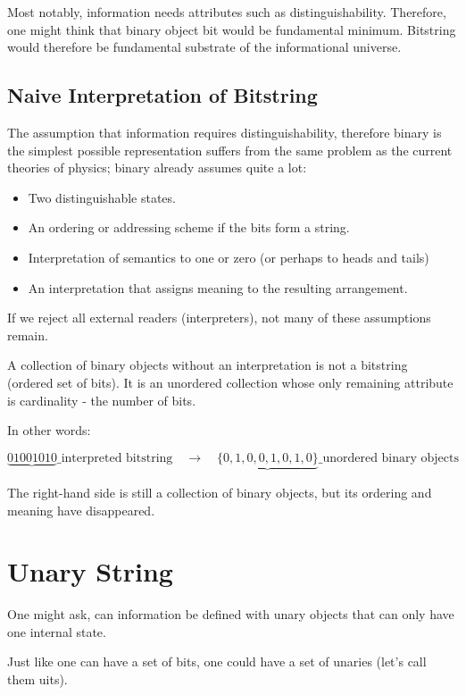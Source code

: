 Most notably, information needs attributes such as distinguishability. Therefore, one might think that
binary object bit would be fundamental minimum.  Bitstring would therefore be fundamental substrate of the informational universe. 


\subsection{Naive Interpretation of Bitstring}

The assumption that information requires distinguishability, therefore binary is the simplest possible representation
suffers from the same problem as the current theories of physics; binary already assumes quite a lot:

\begin{itemize} 
\item Two distinguishable states.
\item An ordering or addressing scheme if the bits form a string.
\item Interpretation of semantics to one or zero (or perhaps to heads and tails)
\item An interpretation that assigns meaning to the resulting arrangement.
\end{itemize}


If we reject all external readers (interpreters), not many of these assumptions remain.

A collection of binary objects without an interpretation is not a bitstring (ordered set of bits).
It is an unordered collection whose only remaining attribute is cardinality - the number of bits. 

In other words:

\[
\underbrace{01001010}\_{\text{interpreted bitstring}} \quad\longrightarrow\quad \underbrace{\{0,1,0,0,1,0,1,0\}}\_{\text{unordered binary objects}}
\]

The right-hand side is still a collection of binary objects, but its ordering and meaning have disappeared.


\section{Unary String}

One might ask, can information be defined with unary objects that can only have one internal state.

Just like one can have a set of bits, one could have a set of unaries (let's call them uits).

